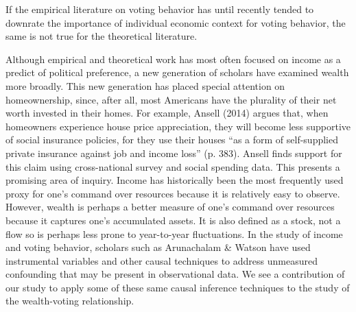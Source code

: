 If the empirical literature on voting behavior has until recently tended to downrate the importance of individual economic context for voting behavior, the same is not true for the theoretical literature.

Although empirical and theoretical work has most often focused on income as a predict of political preference, a new generation of scholars have examined wealth more broadly. This new generation has placed special attention on homeownership, since, after all, most Americans have the plurality of their net worth invested in their homes. For example, Ansell (2014) argues that, when homeowners experience house price appreciation, they will become less supportive of social insurance policies, for they use their houses ``as a form of self-supplied private insurance against job and income loss'' (p. 383). Ansell finds support for this claim using cross-national survey and social spending data. This presents a promising area of inquiry. Income has historically been the most frequently used proxy for one's command over resources because it is relatively easy to observe. However, wealth is perhaps a better measure of one's command over resources because it captures one's accumulated assets. It is also defined as a stock, not a flow so is perhaps less prone to year-to-year fluctuations. In the study of income and voting behavior, scholars such as Arunachalam \& Watson have used instrumental variables and other causal techniques to address unmeasured confounding that may be present in observational data. We see a contribution of our study to apply some of these same causal inference techniques to the study of the wealth-voting relationship. 
